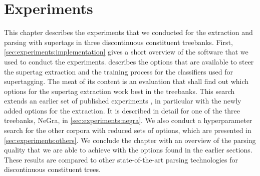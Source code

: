 \documentclass[../document.tex]{subfiles}
\begin{document}
    \chapter{Experiments}
    
    This chapter describes the experiments that we conducted for the extraction and parsing with supertags in three discontinuous constituent treebanks.
    First, \cref{sec:experiments:implementation} gives a short overview of the software that we used to conduct the experiments.
     describes the options that are available to steer the supertag extraction and the training process for the classifiers used for supertagging.
    The meat of its content is an evaluation that shall find out which options for the supertag extraction work best in the treebanks.
    This search extends an earlier set of published experiments \citep{Rup22}, in particular with the newly added options for the extraction.
    It is described in detail for one of the three treebanks, NeGra, in \cref{sec:experiments:negra}.
    We also conduct a hyperparameter search for the other corpora with reduced sets of options, which are presented in \cref{sec:experiments:others}.
    We conclude the chapter with an overview of the parsing quality that we are able to achieve with the options found in the earlier sections.
    These results are compared to other state-of-the-art parsing technologies for discontinuous constituent trees.
    
    
    
    
    
    
\end{document}
